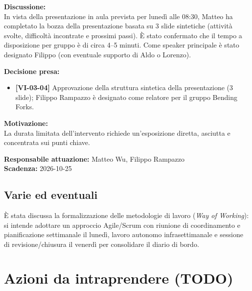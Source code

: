 \documentclass[12pt,a4paper]{article}
\newcommand{\tightlist}{\setlength{\itemsep}{1pt}\setlength{\parskip}{0pt}}
\begin{document}
\textbf{Discussione:} \\
In vista della presentazione in aula prevista per lunedì alle 08:30, Matteo ha completato la bozza della presentazione basata su 3 slide sintetiche (attività svolte, difficoltà incontrate e prossimi passi). È stato confermato che il tempo a disposizione per gruppo è di circa 4--5 minuti. Come speaker principale è stato designato Filippo (con eventuale supporto di Aldo o Lorenzo).

\textbf{Decisione presa:}
\begin{itemize}
\tightlist
\item[$\checkmark$] \textbf{[VI-03-04]} Approvazione della struttura sintetica della presentazione (3 slide); Filippo Rampazzo è designato come relatore per il gruppo Bending Forks.
\end{itemize}

\textbf{Motivazione:} \\
La durata limitata dell'intervento richiede un'esposizione diretta, asciutta e concentrata sui punti chiave.

\textbf{Responsabile attuazione:} Matteo Wu, Filippo Rampazzo \\
\textbf{Scadenza:} 2026-10-25

\hypertarget{varie-ed-eventuali}{%
\subsection{Varie ed eventuali}}
È stata discussa la formalizzazione delle metodologie di lavoro (\emph{Way of Working}): si intende adottare un approccio Agile/Scrum con riunione di coordinamento e pianificazione settimanale il lunedì, lavoro autonomo infrasettimanale e sessione di revisione/chiusura il venerdì per consolidare il diario di bordo.

\hypertarget{azioni-da-intraprendere}{%
\section{Azioni da intraprendere (TODO)}}
\end{document}
